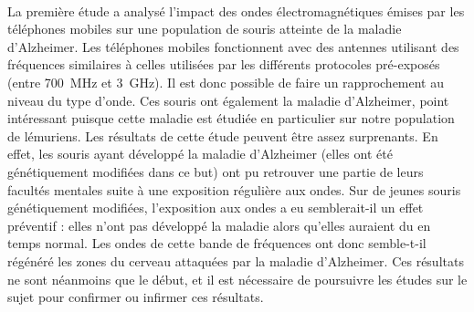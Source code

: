     \paragraph{}La première étude \cite{test2} a analysé l'impact des ondes électromagnétiques émises par les téléphones mobiles sur une population de souris atteinte de la maladie d'Alzheimer. Les téléphones mobiles fonctionnent avec des antennes utilisant des fréquences similaires à celles utilisées par les différents protocoles pré-exposés (entre 700~MHz et 3~GHz). Il est donc possible de faire un rapprochement au niveau du type d'onde. Ces souris ont également la maladie d'Alzheimer\cite{BONS1996S66}, point intéressant puisque cette maladie est étudiée en particulier sur notre population de lémuriens. Les résultats de cette étude peuvent être assez surprenants. En effet, les souris ayant développé la maladie d'Alzheimer (elles ont été génétiquement modifiées dans ce but) ont pu retrouver une partie de leurs facultés mentales suite à une exposition régulière aux ondes. Sur de jeunes souris génétiquement modifiées, l'exposition aux ondes a eu semblerait-il un effet préventif : elles n'ont pas développé la maladie alors qu'elles auraient du en temps normal. Les ondes de cette bande de fréquences ont donc semble-t-il régénéré les zones du cerveau attaquées par la maladie d'Alzheimer. Ces résultats ne sont néanmoins que le début, et il est nécessaire de poursuivre les études sur le sujet pour confirmer ou infirmer ces résultats.
    
